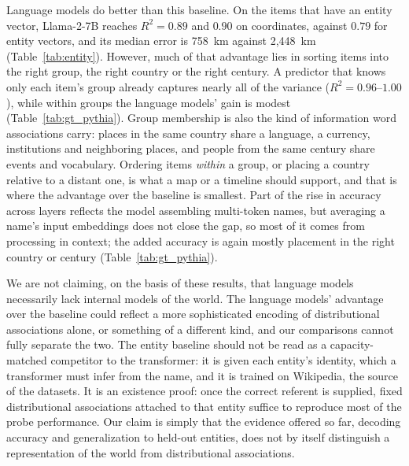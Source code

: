 \documentclass[11pt]{article}
\begin{document}
Language models do better than this baseline. On the items that have an entity vector, Llama-2-7B reaches $R^2 = 0.89$ and $0.90$ on coordinates, against $0.79$ for entity vectors, and its median error is 758~km against 2{,}448~km (Table~\ref{tab:entity}). However, much of that advantage lies in sorting items into the right group, the right country or the right century. A predictor that knows only each item's group already captures nearly all of the variance ($R^2 = 0.96$--$1.00$), while within groups the language models' gain is modest (Table~\ref{tab:gt_pythia}). Group membership is also the kind of information word associations carry: places in the same country share a language, a currency, institutions and neighboring places, and people from the same century share events and vocabulary. Ordering items \emph{within} a group, or placing a country relative to a distant one, is what a map or a timeline should support, and that is where the advantage over the baseline is smallest. Part of the rise in accuracy across layers reflects the model assembling multi-token names, but averaging a name's input embeddings does not close the gap, so most of it comes from processing in context; the added accuracy is again mostly placement in the right country or century (Table~\ref{tab:gt_pythia}).

We are not claiming, on the basis of these results, that language models necessarily lack internal models of the world. The language models' advantage over the baseline could reflect a more sophisticated encoding of distributional associations alone, or something of a different kind, and our comparisons cannot fully separate the two. The entity baseline should not be read as a capacity-matched competitor to the transformer: it is given each entity's identity, which a transformer must infer from the name, and it is trained on Wikipedia, the source of the datasets. It is an existence proof: once the correct referent is supplied, fixed distributional associations attached to that entity suffice to reproduce most of the probe performance. Our claim is simply that the evidence offered so far, decoding accuracy and generalization to held-out entities, does not by itself distinguish a representation of the world from distributional associations.
\end{document}

